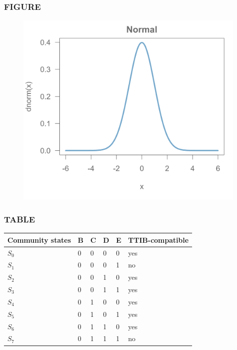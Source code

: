 \documentclass{eecslides}
\begin{document}
    \begin{frame}
        \frametitle{FIGURE}
            \begin{figure}
                \centering
                \includegraphics[width=.8\textwidth]{./fig/fig1.png}
            \end{figure}
    \end{frame}


    \begin{frame}
        \frametitle{TABLE}

    \begin{table}
    \begin{tabular}{|l|l|l|l|l|l|}
      Community states & B & C & D & E & TTIB-compatible \\ \hline
      \(S_{0}\) & 0 & 0 & 0 & 0 & yes \\
      \(S_{1}\) & 0 & 0 & 0 & 1 & no \\
      \(S_{2}\) & 0 & 0 & 1 & 0 & yes \\
      \(S_{3}\) & 0 & 0 & 1 & 1 & yes \\
      \(S_{4}\) & 0 & 1 & 0 & 0 & yes \\
      \(S_{5}\) & 0 & 1 & 0 & 1 & yes \\
      \(S_{6}\) & 0 & 1 & 1 & 0 & yes \\
      \(S_{7}\) & 0 & 1 & 1 & 1 & no
    \end{tabular}
  \end{table}

  \end{frame}
\end{document}
